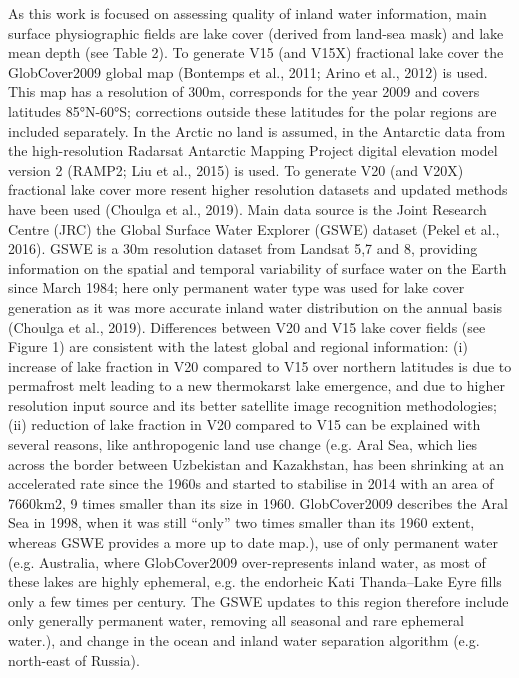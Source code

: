 \documentclass[hess, manuscript]{copernicus}
\begin{document}
As this work is focused on assessing quality of inland water information, main surface physiographic fields are lake cover (derived from land-sea mask) and lake mean depth (see Table 2). To generate V15 (and V15X) fractional lake cover the GlobCover2009 global map (Bontemps et al., 2011; Arino et al., 2012) is used. This map has a resolution of 300m, corresponds for the year 2009 and covers latitudes 85°N-60°S; corrections outside these latitudes for the polar regions are included separately. In the Arctic no land is assumed, in the Antarctic data from the high-resolution Radarsat Antarctic Mapping Project digital elevation model version 2 (RAMP2; Liu et al., 2015) is used. To generate V20 (and V20X) fractional lake cover more resent higher resolution datasets and updated methods have been used (Choulga et al., 2019). Main data source is the Joint Research Centre (JRC) the Global Surface Water Explorer (GSWE) dataset (Pekel et al., 2016). GSWE is a 30m resolution dataset from Landsat 5,7 and 8, providing information on the spatial and temporal variability of surface water on the Earth since March 1984; here only permanent water type was used for lake cover generation as it was more accurate inland water distribution on the annual basis (Choulga et al., 2019). Differences between V20 and V15 lake cover fields (see Figure 1) are consistent with the latest global and regional information: (i) increase of lake fraction in V20 compared to V15 over northern latitudes is due to permafrost melt leading to a new thermokarst lake emergence, and due to higher resolution input source and its better satellite image recognition methodologies; (ii) reduction of lake fraction in V20 compared to V15 can be explained with several reasons, like anthropogenic land use change (e.g. Aral Sea, which lies across the border between Uzbekistan and Kazakhstan, has been shrinking at an accelerated rate since the 1960s and started to stabilise in 2014 with an area of 7660km2, 9 times smaller than its size in 1960. GlobCover2009 describes the Aral Sea in 1998, when it was still “only” two times smaller than its 1960 extent, whereas GSWE provides a more up to date map.), use of only permanent water (e.g. Australia, where GlobCover2009 over-represents inland water, as most of these lakes are highly ephemeral, e.g. the endorheic Kati Thanda–Lake Eyre fills only a few times per century. The GSWE updates to this region therefore include only generally permanent water, removing all seasonal and rare ephemeral water.), and change in the ocean and inland water separation algorithm (e.g. north-east of Russia).
\end{document}
